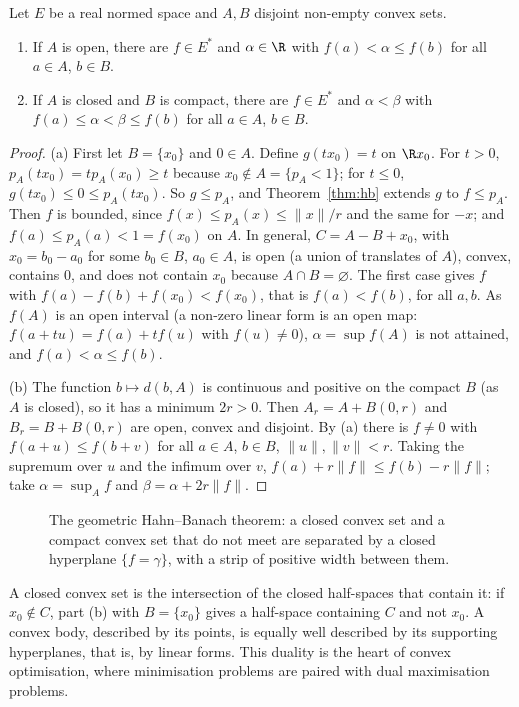 \begin{theorem}\label{thm:separation}
Let $E$ be a real normed space and $A,B$ disjoint non-empty convex sets.
\begin{enumerate}
\item[(a)] If $A$ is open, there are $f\in E^*$ and $\alpha\in\R$ with $f(a)<\alpha\le f(b)$ for all $a\in A$, $b\in B$.
\item[(b)] If $A$ is closed and $B$ is compact, there are $f\in E^*$ and $\alpha<\beta$ with $f(a)\le\alpha<\beta\le f(b)$ for all $a\in A$, $b\in B$.
\end{enumerate}
\end{theorem}
\begin{proof}
(a) First let $B=\{x_0\}$ and $0\in A$. Define $g(tx_0)=t$ on $\R x_0$. For $t>0$, $p_A(tx_0)=tp_A(x_0)\ge t$ because $x_0\notin A=\{p_A<1\}$; for $t\le0$, $g(tx_0)\le0\le p_A(tx_0)$. So $g\le p_A$, and
Theorem~\ref{thm:hb} extends $g$ to $f\le p_A$. Then $f$ is bounded, since $f(x)\le p_A(x)\le\|x\|/r$ and the same for $-x$; and $f(a)\le p_A(a)<1=f(x_0)$ on $A$. In general, $C=A-B+x_0$, with $x_0=b_0-a_0$ for some $b_0\in B$,
$a_0\in A$, is open (a union of translates of $A$), convex, contains $0$, and does not contain $x_0$ because $A\cap B=\varnothing$. The first case gives $f$ with $f(a)-f(b)+f(x_0)<f(x_0)$, that is $f(a)<f(b)$, for all $a,b$. As
$f(A)$ is an open interval (a non-zero linear form is an open map: $f(a+tu)=f(a)+tf(u)$ with $f(u)\ne0$), $\alpha=\sup f(A)$ is not attained, and $f(a)<\alpha\le f(b)$.

(b) The function $b\mapsto d(b,A)$ is continuous and positive on the compact $B$ (as $A$ is closed), so it has a minimum $2r>0$. Then $A_r=A+B(0,r)$ and $B_r=B+B(0,r)$ are open, convex and disjoint. By (a) there is $f\ne0$
with $f(a+u)\le f(b+v)$ for all $a\in A$, $b\in B$, $\|u\|,\|v\|<r$. Taking the supremum over $u$ and the infimum over $v$, $f(a)+r\|f\|\le f(b)-r\|f\|$; take $\alpha=\sup_Af$ and $\beta=\alpha+2r\|f\|$.
\end{proof}

\begin{figure}[ht]
\centering
{}
\caption{The geometric Hahn--Banach theorem: a closed convex set and a compact convex set that do not meet are separated by a closed hyperplane $\{f=\gamma\}$, with a strip of positive width between them.}
\label{fig:separation}
\end{figure}

\begin{beauty}
A closed convex set is the intersection of the closed half-spaces that contain it: if $x_0\notin C$, part (b) with $B=\{x_0\}$ gives a half-space containing $C$ and not $x_0$. A convex body, described by its points, is
equally well described by its supporting hyperplanes, that is, by linear forms. This duality is the heart of convex optimisation, where minimisation problems are paired with dual maximisation problems.
\end{beauty}

